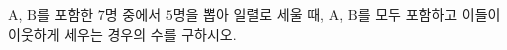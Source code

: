 \hspace*{2mm}\begin{minipage}[t]{\dimexpr\linewidth-2mm\relax}\vspace{0pt}
$\mathrm{A}$, $\mathrm{B}$를 포함한 $7$명 중에서 $5$명을 뽑아 일렬로 세울 때, $\mathrm{A}$, $\mathrm{B}$를 모두 포함하고 이들이 이웃하게 세우는 경우의 수를 구하시오.\end{minipage}
